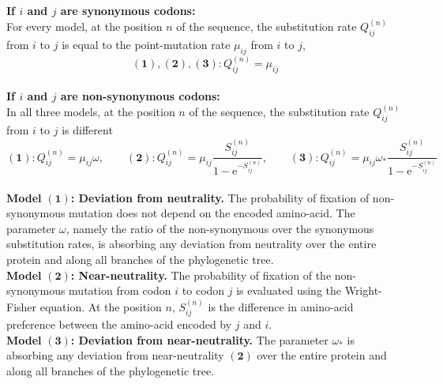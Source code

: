 \documentclass[10pt]{beamer}
\begin{document}
\small
\begin{frame}
\textbf{If \boldmath${i}$ and \boldmath $j$ are synonymous codons:}\\
For every model, at the position $n$ of the sequence, the substitution rate $Q_{ij}^{(n)}$ from $i$ to $j$ is equal to the point-mutation rate $\mu_{ij}$ from $i$ to $j$, 
\begin{equation*}
\mathbf{(1)}, \mathbf{(2)}, \mathbf{(3)}: Q_{ij}^{(n)}=\mu_{ij}
\end{equation*} \\
\vspace{10pt}
\textbf{If \boldmath${i}$ and \boldmath $j$ are non-synonymous codons:}\\
In all three models, at the position $n$ of the sequence, the substitution rate $Q_{ij}^{(n)}$ from $i$ to $j$ is different
\begin{equation*}
\mathbf{(1)}: 
Q_{ij}^{(n)}=
\mu_{ij} \omega,
\qquad
\mathbf{(2)}: 
Q_{ij}^{(n)}=
\mu_{ij} \dfrac{S_{ij}^{(n)}}{1-\mathrm{e}^{-S_{ij}^{(n)}}}, 
\qquad
\mathbf{(3)}: 
Q_{ij}^{(n)}=
\mu_{ij} \omega_{*} \dfrac{S_{ij}^{(n)}}{1-\mathrm{e}^{-S_{ij}^{(n)}}}
\end{equation*}
\vspace{5pt}\\
\textbf{Model }$\mathbf{(1)}$\textbf{: Deviation from neutrality.} The probability of fixation of non-synonymous mutation does not depend on the encoded amino-acid. The parameter $\omega$, namely the ratio of the non-synonymous over the synonymous substitution rates, is absorbing any deviation from neutrality over the entire protein and along all branches of the phylogenetic tree. \\
\vspace{8pt}
\textbf{Model }$\mathbf{(2)}$\textbf{: Near-neutrality.} The probability of fixation of the non-synonymous mutation from codon $i$ to codon $j$ is evaluated using the Wright-Fisher equation. At the position $n$, $S_{ij}^{(n)}$ is the difference in amino-acid preference between the amino-acid encoded by $j$ and $i$. \\
\vspace{8pt}
\textbf{Model }$\mathbf{(3)}$\textbf{: Deviation from near-neutrality.} The parameter $\omega_*$ is absorbing any deviation from near-neutrality $\mathbf{(2)}$ over the entire protein and along all branches of the phylogenetic tree.
\end{frame}
\end{document}
